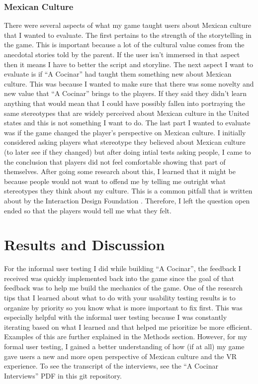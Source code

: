 \documentclass[10pt,twocolumn]{article}
\begin{document}
\subsubsection{Mexican Culture}
There were several aspects of what my game taught users about Mexican culture that I wanted to evaluate. The first pertains to the strength of the storytelling in the game. This is important because a lot of the cultural value comes from the anecdotal stories told by the parent. If the user isn’t immersed in that aspect then it means I have to better the script and storyline. The next aspect I want to evaluate is if “A Cocinar” had taught them something new about Mexican culture. This was because I wanted to make sure that there was some novelty and new value that “A Cocinar” brings to the players. If they said they didn’t learn anything that would mean that I could have possibly fallen into portraying the same stereotypes that are widely perceived about Mexican culture in the United states and this is not something I want to do. The last part I wanted to evaluate was if the game changed the player’s perspective on Mexican culture. I initially considered asking players what stereotype they believed about Mexican culture (to later see if they changed) but after doing intial tests asking people, I came to the conclusion that players did not feel comfortable showing that part of themselves. After going some research about this, I learned that it might be because people would not want to offend me by telling me outright what stereotypes they think about my culture. This is a common pitfall that is written about by the Interaction Design Foundation \cite{pitfall2022}. Therefore, I left the question open ended so that the players would tell me what they felt. 


\section{Results and Discussion}
For the informal user testing I did while building “A Cocinar”, the feedback I received was quickly implemented back into the game since the goal of that feedback was to help me build the mechanics of the game. One of the research tips that I learned about what to do with your usability testing results is to organize by priority so you know what is more important to fix first\cite{testResults}. This was especially helpful with the informal user testing because I was constantly iterating based on what I learned and that helped me prioritize be more efficient. Examples of this are further explained in the Methods section. However, for my formal user testing, I gained a better understanding of how (if at all) my game gave users a new and more open perspective of Mexican culture and the VR experience. To see the transcript of the interviews, see the “A Cocinar Interviews” PDF in this git repository.
\end{document}
